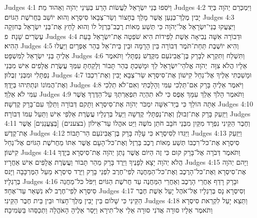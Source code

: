 Judges 4:1	וַיֹּסִפוּ בְּנֵי יִשְׂרָאֵל לַעֲשׂוֹת הָרַע בְּעֵינֵי יְהֹוָה וְאֵהוּד מֵת׃
Judges 4:2	וַיִּמְכְּרֵם יְהֹוָה בְּיַד יָבִין מֶלֶךְ־כְּנַעַן אֲשֶׁר מָלַךְ בְּחָצוֹר וְשַׂר־צְבָאוֹ סִיסְרָא וְהוּא יוֹשֵׁב בַּחֲרֹשֶׁת הַגּוֹיִם׃
Judges 4:3	וַיִּצְעֲקוּ בְנֵי־יִשְׂרָאֵל אֶל־יְהֹוָה כִּי תְּשַׁע מֵאוֹת רֶכֶב־בַּרְזֶל לוֹ וְהוּא לָחַץ אֶת־בְּנֵי יִשְׂרָאֵל בְּחזְקָה עֶשְׂרִים שָׁנָה׃ {פ}
Judges 4:4	וּדְבוֹרָה אִשָּׁה נְבִיאָה אֵשֶׁת לַפִּידוֹת הִיא שֹׁפְטָה אֶת־יִשְׂרָאֵל בָּעֵת הַהִיא׃
Judges 4:5	וְהִיא יוֹשֶׁבֶת תַּחַת־תֹּמֶר דְּבוֹרָה בֵּין הָרָמָה וּבֵין בֵּית־אֵל בְּהַר אֶפְרָיִם וַיַּעֲלוּ אֵלֶיהָ בְּנֵי יִשְׂרָאֵל לַמִּשְׁפָּט׃
Judges 4:6	וַתִּשְׁלַח וַתִּקְרָא לְבָרָק בֶּן־אֲבִינֹעַם מִקֶּדֶשׁ נַפְתָּלִי וַתֹּאמֶר אֵלָיו הֲלֹא צִוָּה  יְהֹוָה אֱלֹהֵי־יִשְׂרָאֵל לֵךְ וּמָשַׁכְתָּ בְּהַר תָּבוֹר וְלָקַחְתָּ עִמְּךָ עֲשֶׂרֶת אֲלָפִים אִישׁ מִבְּנֵי נַפְתָּלִי וּמִבְּנֵי זְבֻלוּן׃
Judges 4:7	וּמָשַׁכְתִּי אֵלֶיךָ אֶל־נַחַל קִישׁוֹן אֶת־סִיסְרָא שַׂר־צְבָא יָבִין וְאֶת־רִכְבּוֹ וְאֶת־הֲמוֹנוֹ וּנְתַתִּיהוּ בְּיָדֶךָ׃
Judges 4:8	וַיֹּאמֶר אֵלֶיהָ בָּרָק אִם־תֵּלְכִי עִמִּי וְהָלָכְתִּי וְאִם־לֹא תֵלְכִי עִמִּי לֹא אֵלֵךְ׃
Judges 4:9	וַתֹּאמֶר הָלֹךְ אֵלֵךְ עִמָּךְ אֶפֶס כִּי לֹא תִהְיֶה תִּפְאַרְתְּךָ עַל־הַדֶּרֶךְ אֲשֶׁר אַתָּה הוֹלֵךְ כִּי בְיַד־אִשָּׁה יִמְכֹּר יְהֹוָה אֶת־סִיסְרָא וַתָּקם דְּבוֹרָה וַתֵּלֶךְ עִם־בָּרָק קֶדְשָׁה׃
Judges 4:10	וַיַּזְעֵק בָּרָק אֶת־זְבוּלֻן וְאֶת־נַפְתָּלִי קֶדְשָׁה וַיַּעַל בְּרַגְלָיו עֲשֶׂרֶת אַלְפֵי אִישׁ וַתַּעַל עִמּוֹ דְּבוֹרָה׃
Judges 4:11	וְחֶבֶר הַקֵּינִי נִפְרָד מִקַּיִן מִבְּנֵי חֹבָב חֹתֵן מֹשֶׁה וַיֵּט אהֳלוֹ עַד־אֵילוֹן (בצענים) [בְּצַעֲנַנִּים] אֲשֶׁר אֶת־קֶדֶשׁ׃
Judges 4:12	וַיַּגִּדוּ לְסִיסְרָא כִּי עָלָה בָּרָק בֶּן־אֲבִינֹעַם הַר־תָּבוֹר׃
Judges 4:13	וַיַּזְעֵק סִיסְרָא אֶת־כּל־רִכְבּוֹ תְּשַׁע מֵאוֹת רֶכֶב בַּרְזֶל וְאֶת־כּל־הָעָם אֲשֶׁר אִתּוֹ מֵחֲרֹשֶׁת הַגּוֹיִם אֶל־נַחַל קִישׁוֹן׃
Judges 4:14	וַתֹּאמֶר דְּבֹרָה אֶל־בָּרָק קוּם כִּי זֶה הַיּוֹם אֲשֶׁר נָתַן יְהֹוָה אֶת־סִיסְרָא בְּיָדֶךָ הֲלֹא יְהֹוָה יָצָא לְפָנֶיךָ וַיֵּרֶד בָּרָק מֵהַר תָּבוֹר וַעֲשֶׂרֶת אֲלָפִים אִישׁ אַחֲרָיו׃
Judges 4:15	וַיָּהם יְהֹוָה אֶת־סִיסְרָא וְאֶת־כּל־הָרֶכֶב וְאֶת־כּל־הַמַּחֲנֶה לְפִי־חֶרֶב לִפְנֵי בָרָק וַיֵּרֶד סִיסְרָא מֵעַל הַמֶּרְכָּבָה וַיָּנס בְּרַגְלָיו׃
Judges 4:16	וּבָרָק רָדַף אַחֲרֵי הָרֶכֶב וְאַחֲרֵי הַמַּחֲנֶה עַד חֲרֹשֶׁת הַגּוֹיִם וַיִּפֹּל כּל־מַחֲנֵה סִיסְרָא לְפִי־חֶרֶב לֹא נִשְׁאַר עַד־אֶחָד׃
Judges 4:17	וְסִיסְרָא נָס בְּרַגְלָיו אֶל־אֹהֶל יָעֵל אֵשֶׁת חֶבֶר הַקֵּינִי כִּי שָׁלוֹם בֵּין יָבִין מֶלֶךְ־חָצוֹר וּבֵין בֵּית חֶבֶר הַקֵּינִי׃
Judges 4:18	וַתֵּצֵא יָעֵל לִקְרַאת סִיסְרָא וַתֹּאמֶר אֵלָיו סוּרָה אֲדֹנִי סוּרָה אֵלַי אַל־תִּירָא וַיָּסַר אֵלֶיהָ הָאֹהֱלָה וַתְּכַסֵּהוּ בַּשְּׂמִיכָה׃

